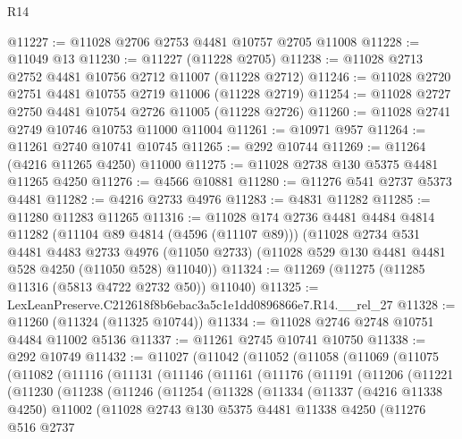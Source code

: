 \begin{lexlean}{R14}
\begin{coremodule}
@11227 := @11028 @2706 @2753 @4481 @10757 @2705 @11008
@11228 := @11049 @13
@11230 := @11227 (@11228 @2705)
@11238 := @11028 @2713 @2752 @4481 @10756 @2712 @11007 (@11228 @2712)
@11246 := @11028 @2720 @2751 @4481 @10755 @2719 @11006 (@11228 @2719)
@11254 := @11028 @2727 @2750 @4481 @10754 @2726 @11005 (@11228 @2726)
@11260 := @11028 @2741 @2749 @10746 @10753 @11000 @11004
@11261 := @10971 @957
@11264 := @11261 @2740 @10741 @10745
@11265 := @292 @10744
@11269 := @11264 (@4216 @11265 @4250) @11000
@11275 := @11028 @2738 @130 @5375 @4481 @11265 @4250
@11276 := @4566 @10881
@11280 := @11276 @541 @2737 @5373 @4481
@11282 := @4216 @2733 @4976
@11283 := @4831 @11282
@11285 := @11280 @11283 @11265
@11316 := @11028
    @174
    @2736
    @4481
    @4484
    @4814
    @11282
    (@11104 @89 @4814 (@4596 (@11107 @89)))
    (@11028
      @2734
      @531
      @4481
      @4483
      @2733
      @4976
      (@11050 @2733)
      (@11028 @529 @130 @4481 @4481 @528 @4250 (@11050 @528) @11040))
@11324 := @11269 (@11275 (@11285 @11316 (@5813 @4722 @2732 @50)) @11040)
@11325 := LexLeanPreserve.C212618f8b6ebac3a5c1e1dd0896866e7.R14.__rel_27
@11328 := @11260 (@11324 (@11325 @10744))
@11334 := @11028 @2746 @2748 @10751 @4484 @11002 @5136
@11337 := @11261 @2745 @10741 @10750
@11338 := @292 @10749
@11432 := @11027
    (@11042
      (@11052
        (@11058
          (@11069
            (@11075
              (@11082
                (@11116
                  (@11131
                    (@11146
                      (@11161
                        (@11176
                          (@11191
                            (@11206
                              (@11221
                                (@11230
                                  (@11238
                                    (@11246
                                      (@11254
                                        (@11328
                                          (@11334
                                            (@11337
                                              (@4216 @11338 @4250)
                                              @11002
                                              (@11028
                                                @2743
                                                @130
                                                @5375
                                                @4481
                                                @11338
                                                @4250
                                                (@11276
                                                  @516
                                                  @2737

\end{coremodule}
\end{lexlean}
